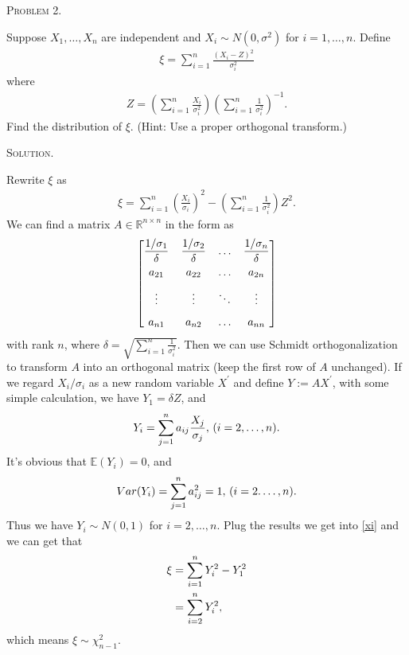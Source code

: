 \documentclass{article}
\begin{document}
\begin{CJK}{UTF8}{gbsn}
    \begin{shaded}
        \noindent\textsc{Problem 2.}\par
        Suppose $X_1,\ldots, X_n$ are independent and $X_i\sim N(0,\sigma^2)$ for $i=1,\ldots,n$. Define
        \begin{align}
            \xi = \sum_{i=1}^n \frac{(X_i-Z)^2}{\sigma_i^2}
        \end{align}
        where
        \begin{align}
            Z = \left (\sum_{i=1}^n\frac{X_i}{\sigma_i^2} \right ) \left (\sum_{i=1}^n\frac{1}{\sigma_i^2} \right )^{-1}.
        \end{align}
        Find the distribution of $\xi$. (Hint: Use a proper orthogonal transform.)
    \end{shaded}
    \noindent\textsc{Solution.}\par
    Rewrite $\xi$ as
    \begin{align}
        \xi = \sum_{i=1}^n \left ( \frac{X_i}{\sigma_i}\right )^2 - \left (\sum_{i=1}^n \frac{1}{\sigma_i^2}\right ) Z^2. \label{xi}
    \end{align}
    We can find a matrix $A\in \mathbb{R}^{n\times n}$ in the form as
    \[
        \setlength{\arraycolsep}{5.5pt}
        \begin{bmatrix}
            \dfrac{1/\sigma_1}{\delta} & \dfrac{1/\sigma_2}{\delta} & \ldots & \dfrac{1/\sigma_n}{\delta} \\[7pt]
            a_{21}                     & a_{22}                     & \ldots & a_{2n}                     \\[7pt]
            \vdots                     & \vdots                     & \ddots & \vdots                     \\[7pt]
            a_{n1}                     & a_{n2}                     & \ldots & a_{nn}
        \end{bmatrix}
    \]
    with rank $n$, where $\delta = \sqrt{\sum_{i=1}^n \frac{1}{\sigma_i^2}}$.
    Then we can use Schmidt orthogonalization to transform $A$ into an orthogonal matrix (keep the first row of $A$ unchanged).
    If we regard $X_i/\sigma_i$ as a new random variable $X^{\prime}$ and define $Y:=AX^{\prime}$,
    with some simple calculation, we have $Y_1=\delta Z$,
    and
    \begin{align}
        Y_i = \sum_{j=1}^n a_{ij} \frac{X_j}{\sigma_j},\, (i=2,\ldots,n).\notag
    \end{align}
    It's obvious that $\mathbb{E}(Y_i)=0$, and
    \begin{align}
        Var(Y_i) = \sum_{j=1}^n a_{ij}^2 = 1, \, (i=2.\ldots,n).\notag
    \end{align}
    Thus we have $Y_i \sim N(0,1)$ for $i=2,\ldots,n$.
    Plug the results we get into \eqref{xi} and we can get that
    \begin{align}
        \xi & = \sum_{i=1}^nY_i^2 - Y_1^2 \notag \\
            & = \sum_{i=2}^n Y_i^2, \notag
    \end{align}
    which means $\xi \sim \chi^2_{n-1}$.



\end{CJK}
\end{document}
